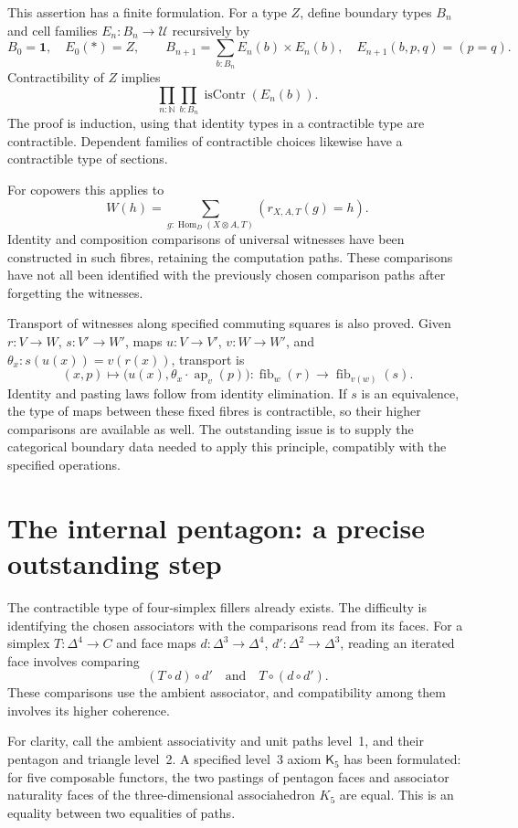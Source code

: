 \documentclass[11pt,a4paper]{amsart}
\theoremstyle{definition}
\newcommand{\Hom}{\operatorname{Hom}}
\newcommand{\fib}{\operatorname{fib}}
\newcommand{\ap}{\operatorname{ap}}
\newcommand{\isContr}{\operatorname{isContr}}
\newcommand{\U}{\mathcal U}
\newcommand{\pt}{\mathbf 1}
\newcommand{\Kfive}{\mathsf K_5}
\begin{document}
This assertion has a finite formulation. For a type $Z$, define boundary
types $B_n$ and cell families $E_n:B_n\to\U$ recursively by
\[
 B_0=\pt,\quad E_0(*)=Z,\qquad
 B_{n+1}=\sum_{b:B_n}E_n(b)\times E_n(b),\quad
 E_{n+1}(b,p,q)=(p=q).
\]
Contractibility of $Z$ implies
\[
 \prod_{n:\mathbb N}\prod_{b:B_n}\isContr(E_n(b)).
\]
The proof is induction, using that identity types in a contractible type
are contractible. Dependent families of contractible choices likewise
have a contractible type of sections.

For copowers this applies to
\[
 W(h)=\sum_{g:\Hom_D(X\otimes A,T)}(r_{X,A,T}(g)=h).
\]
Identity and composition comparisons of universal witnesses have been
constructed in such fibres, retaining the computation paths. These
comparisons have not all been identified with the previously chosen
comparison paths after forgetting the witnesses.

Transport of witnesses along specified commuting squares is also
proved. Given $r:V\to W$, $s:V'\to W'$, maps $u:V\to V'$,
$v:W\to W'$, and $\theta_x:s(u(x))=v(r(x))$, transport is
\[
 (x,p)\longmapsto\bigl(u(x),\theta_x\cdot\ap_v(p)\bigr)
 :\fib_w(r)\longrightarrow\fib_{v(w)}(s).
\]
Identity and pasting laws follow from identity elimination. If $s$ is
an equivalence, the type of maps between these fixed fibres is
contractible, so their higher comparisons are available as well.
The outstanding issue is to supply the categorical boundary data
needed to apply this principle, compatibly with the specified operations.

\section{The internal pentagon: a precise outstanding step}

The contractible type of four-simplex fillers already exists. The
difficulty is identifying the chosen associators with the comparisons
read from its faces. For a simplex $T:\Delta^4\to C$ and face maps
$d:\Delta^3\to\Delta^4$, $d':\Delta^2\to\Delta^3$, reading an iterated
face involves comparing
\[
 (T\circ d)\circ d'\quad\text{and}\quad T\circ(d\circ d').
\]
These comparisons use the ambient associator, and compatibility among
them involves its higher coherence.

For clarity, call the ambient associativity and unit paths level~1,
and their pentagon and triangle level~2. A specified level~3 axiom
$\Kfive$ has been formulated: for five composable functors, the two
pastings of pentagon faces and associator naturality faces of the
three-dimensional associahedron $K_5$ are equal. This is an equality
between two equalities of paths.
\end{document}
